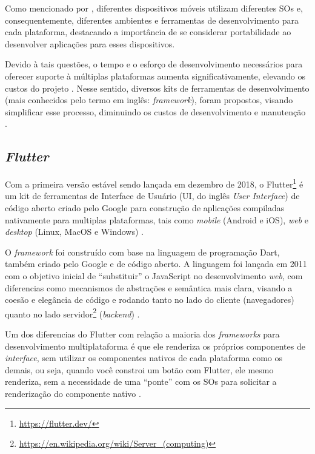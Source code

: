 Como mencionado por , diferentes dispositivos móveis utilizam diferentes SOs e, consequentemente, diferentes
ambientes e ferramentas de desenvolvimento para cada plataforma, destacando a importância de se considerar portabilidade ao desenvolver aplicações
para esses dispositivos.

Devido à tais questões, o tempo e o esforço de desenvolvimento necessários para oferecer suporte à múltiplas plataformas aumenta
significativamente, elevando os custos do projeto \cite{Henning2013,Wasserman2010}. Nesse sentido, diversos kits de ferramentas de
desenvolvimento (mais conhecidos pelo termo em inglês: \emph{framework}), foram propostos, visando simplificar esse processo, diminuindo os
custos de desenvolvimento e manutenção \cite{Martinez2017,Francese2015}.

\subsection{\emph{Flutter}}

Com a primeira versão estável sendo lançada em dezembro de 2018, o Flutter\footnote{\url{https://flutter.dev/}} é um kit de ferramentas de Interface
de Usuário (UI, do inglês \emph{User Interface}) de código aberto criado pelo Google para construção de aplicações compiladas nativamente
para multiplas plataformas, tais como \emph{mobile} (Android e iOS), \emph{web} e \emph{desktop} (Linux, MacOS e Windows) \cite{kuzmin2020experience}.

O \emph{framework} foi construído com base na linguagem de programação Dart, também criado pelo Google e de código aberto.
A linguagem foi lançada em 2011 com o objetivo inicial de ``substituir'' o JavaScript no desenvolvimento \emph{web},
com diferencias como mecanismos de abstrações e semântica mais clara, visando a coesão e elegância de código e
rodando tanto no lado do cliente (navegadores) quanto no lado servidor\footnote{\url{https://en.wikipedia.org/wiki/Server_(computing)}}
(\emph{backend}) \cite{walrath2012dart}.

Um dos diferencias do Flutter com relação a maioria dos \emph{frameworks} para desenvolvimento multiplataforma é que ele renderiza os próprios
componentes de \emph{interface}, sem utilizar os componentes nativos de cada plataforma como os demais, ou seja, quando você constroi um botão com Flutter,
ele mesmo renderiza, sem a necessidade de uma ``ponte'' com os SOs para solicitar a renderização do componente nativo \cite{zammetti2019practical,boukhary2019clean}.

